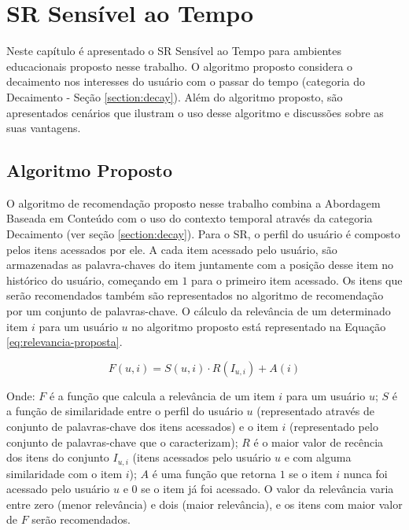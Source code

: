 \chapter{SR Sensível ao Tempo}\label{chapter:proposta}

Neste capítulo é apresentado o SR Sensível ao Tempo para ambientes educacionais proposto nesse trabalho. O algoritmo proposto
considera o decaimento nos interesses do usuário com o passar do tempo (categoria do Decaimento - Seção \ref{section:decay}). Além
do algoritmo proposto, são apresentados cenários que ilustram o uso desse algoritmo e discussões sobre as suas vantagens.

\section{Algoritmo Proposto}\label{section:algoritmo-proposto}

O algoritmo de recomendação proposto nesse trabalho combina a Abordagem Baseada em Conteúdo com o uso do
contexto temporal através da categoria Decaimento (ver seção \ref{section:decay}). Para o SR, o perfil do usuário é composto pelos
itens acessados por ele. A cada item acessado pelo usuário, são armazenadas as palavra-chaves
do item juntamente com a posição desse item no histórico do usuário, começando em $1$ para o
primeiro item acessado. Os itens que serão recomendados também são representados no algoritmo de recomendação por um conjunto de palavras-chave. O cálculo da
relevância de um determinado item $i$ para um usuário $u$ no algoritmo proposto está representado na Equação \ref{eq:relevancia-proposta}.

\begin{equation}
  F(u,i) = S(u,i) \cdot R(I_{u,i}) + A(i)
  \label{eq:relevancia-proposta}
\end{equation}

Onde: $F$ é a função que calcula a relevância de um item $i$ para um usuário $u$; $S$ é a função de similaridade entre
o perfil do usuário $u$ (representado através de conjunto de palavras-chave dos itens acessados) e o item $i$
(representado pelo conjunto de palavras-chave que o caracterizam); $R$ é o maior valor de recência dos itens do conjunto
$I_{u,i}$ (itens acessados pelo usuário $u$ e com alguma similaridade com o item $i$); $A$ é uma função que retorna $1$
se o item $i$ nunca foi acessado pelo usuário $u$ e $0$ se o item já foi acessado.  O valor da relevância
varia entre zero (menor relevância) e dois (maior relevância), e os itens com maior valor de $F$ serão recomendados.

